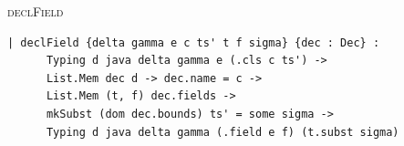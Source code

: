 \begin{cmp}{\textsc{declField}}
\begin{paperside}
\end{paperside}
\begin{leanside}
\begin{lstlisting}[style=leanside]
  | declField {delta gamma e c ts' t f sigma} {dec : Dec} :
      Typing d java delta gamma e (.cls c ts') ->
      List.Mem dec d -> dec.name = c ->
      List.Mem (t, f) dec.fields ->
      mkSubst (dom dec.bounds) ts' = some sigma ->
      Typing d java delta gamma (.field e f) (t.subst sigma)
\end{lstlisting}
\end{leanside}
\end{cmp}

